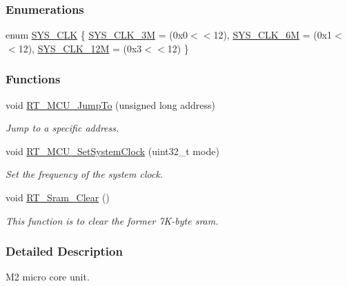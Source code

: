 \subsubsection*{Enumerations}
\begin{DoxyCompactItemize}
\item 
enum \mbox{\hyperlink{a00020_ae3a2d501b8662e11b969fb4a5e195e5b}{S\+Y\+S\+\_\+\+C\+LK}} \{ \mbox{\hyperlink{a00020_ae3a2d501b8662e11b969fb4a5e195e5baaac7754daa9ff2db35951f3539495122}{S\+Y\+S\+\_\+\+C\+L\+K\+\_\+3M}} = (0x0$<$$<$12), 
\mbox{\hyperlink{a00020_ae3a2d501b8662e11b969fb4a5e195e5bad1640aa8c46162a7551abca12293ef39}{S\+Y\+S\+\_\+\+C\+L\+K\+\_\+6M}} = (0x1$<$$<$12), 
\mbox{\hyperlink{a00020_ae3a2d501b8662e11b969fb4a5e195e5ba6c646c9a1e4c38ef0af6d576eacfb401}{S\+Y\+S\+\_\+\+C\+L\+K\+\_\+12M}} = (0x3$<$$<$12)
 \}
\end{DoxyCompactItemize}
\subsubsection*{Functions}
\begin{DoxyCompactItemize}
\item 
void \mbox{\hyperlink{a00020_aa106e3c9181a65a83156bda31f4f61e9}{R\+T\+\_\+\+M\+C\+U\+\_\+\+Jump\+To}} (unsigned long address)
\begin{DoxyCompactList}\small\item\em Jump to a specific address. \end{DoxyCompactList}\item 
void \mbox{\hyperlink{a00020_a1e578ce669735935a1d505c0edf98221}{R\+T\+\_\+\+M\+C\+U\+\_\+\+Set\+System\+Clock}} (uint32\+\_\+t mode)
\begin{DoxyCompactList}\small\item\em Set the frequency of the system clock. \end{DoxyCompactList}\item 
void \mbox{\hyperlink{a00020_ad514417aa2e5a5d061a5eabeceae20c6}{R\+T\+\_\+\+Sram\+\_\+\+Clear}} ()
\begin{DoxyCompactList}\small\item\em This function is to clear the former 7\+K-\/byte sram. \end{DoxyCompactList}\end{DoxyCompactItemize}


\subsubsection{Detailed Description}
M2 micro core unit. 

